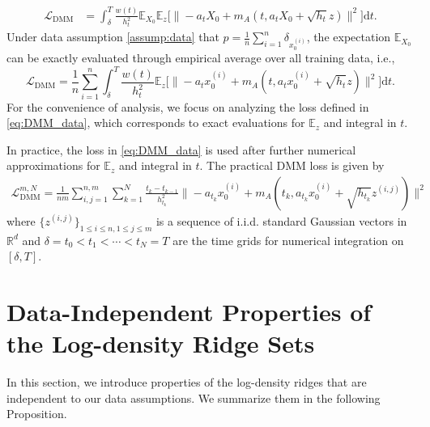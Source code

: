 \documentclass[11pt]{article}
\newcommand{\mb}{\mathbb}
\newcommand{\dee}{\mathrm{d}}
\newcommand{\mc}{\mathcal}
\newcommand{\DMM}{\mc{L}_{\mathrm{DMM}}}
\begin{document}
\begin{align*}
    \DMM & =  \int_\delta^{T}  \frac{w(t)}{h_t^{2}}\mb{E}_{X_0}\mb{E}_z\big[\|  -a_t X_0+ m_A(t,a_t X_0 + \sqrt{h_t}z) \|^2 \big] \dee t.
\end{align*}
Under data assumption \ref{assump:data} that $p=\tfrac{1}{n}\sum_{i=1}^n \delta_{x_0^{(i)}}$, the expectation $\mb{E}_{X_0}$ can be exactly evaluated through empirical average over all training data, i.e., 
\begin{equation}\label{eq:DMM_data}
    \DMM  =  \frac{1}{n}\sum_{i=1}^n \int_\delta^{T}  \frac{w(t)}{h_t^{2}}\mb{E}_z\big[ \|  -a_t x_0^{(i)}+ m_A(t,a_t x_0^{(i)} + \sqrt{h_t}z) \|^2 \big] \dee t.
\end{equation}
For the convenience of analysis, we focus on analyzing the loss defined in \eqref{eq:DMM_data}, which corresponds to exact evaluations for $\mb{E}_z$ and integral in $t$.

In practice, the loss in \eqref{eq:DMM_data} is used after further numerical approximations for $\mb{E}_z$ and integral in $t$. The practical DMM loss is given by
\begin{align*}
    \DMM^{m,N} = \frac{1}{nm}\sum_{i,j=1}^{n,m}\sum_{k=1}^N \frac{t_{k}-t_{k-1}}{h_{t_k}^2} \|  -a_{t_k} x_0^{(i)}+ m_A(t_k,a_{t_k} x_0^{(i)} + \sqrt{h_{t_k}}z^{(i,j)}) \|^2
\end{align*}
where $\{z^{(i,j)}\}_{1\le i\le n, 1\le j\le m}$ is a sequence of i.i.d. standard Gaussian vectors in $\mb{R}^d$ and $\delta=t_0<t_1<\cdots<t_N=T$ are the time grids for numerical integration on $[\delta,T]$. 

\section{Data-Independent Properties of the Log-density Ridge Sets} 

In this section, we introduce properties of the log-density ridges that are independent to our data assumptions. We summarize them in the following Proposition.
\end{document}
